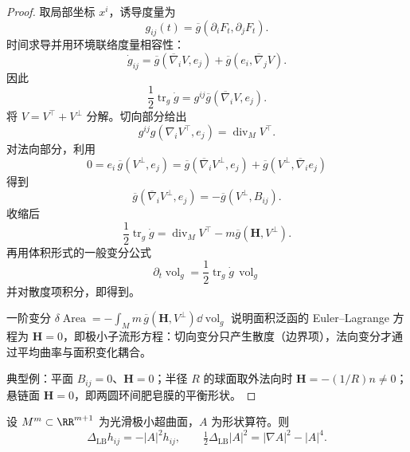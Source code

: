 \begin{proof}
取局部坐标 $x^i$，诱导度量为
\[
g_{ij}(t)
=\overline g(\partial_iF_t,\partial_jF_t).
\]
时间求导并用环境联络度量相容性：
\[
\dot g_{ij}
=\overline g(\overline\nabla_iV,e_j)
+\overline g(e_i,\overline\nabla_jV).
\]
因此
\[
\frac12\operatorname{tr}_g\dot g
=g^{ij}\overline g(\overline\nabla_iV,e_j).
\]
将 $V=V^\top+V^\perp$ 分解。切向部分给出
\[
g^{ij}g(\nabla_iV^\top,e_j)
=\operatorname{div}_M V^\top.
\]
对法向部分，利用
\[
0=e_i\,\overline g(V^\perp,e_j)
=\overline g(\overline\nabla_iV^\perp,e_j)
+\overline g(V^\perp,\overline\nabla_ie_j)
\]
得到
\[
\overline g(\overline\nabla_iV^\perp,e_j)
=-\overline g(V^\perp,B_{ij}).
\]
收缩后
\[
\frac12\operatorname{tr}_g\dot g
=\operatorname{div}_M V^\top
-m\overline g(\mathbf H,V^\perp).
\]
再用体积形式的一般变分公式
\[
\partial_t\operatorname{vol}_g
=\frac12\operatorname{tr}_g\dot g\,\operatorname{vol}_g
\]
并对散度项积分，即得到。

一阶变分 $\delta\operatorname{Area}=-\int_M m\,\overline g(\mathbf H,V^\perp)\dd\operatorname{vol}_g$ 说明面积泛函的 Euler--Lagrange 方程为 $\mathbf H=0$，即极小子流形方程：切向变分只产生散度（边界项），法向变分才通过平均曲率与面积变化耦合。

典型例：平面 $B_{ij}=0$、$\mathbf H=0$；半径 $R$ 的球面取外法向时 $\mathbf H=-(1/R)n\neq0$；悬链面 $\mathbf H=0$，即两圆环间肥皂膜的平衡形状。
\end{proof}

\begin{theorem}
设 $M^m\subset\RR^{m+1}$ 为光滑极小超曲面，$A$ 为形状算符。则\[\Delta_{\mathrm{LB}}h_{ij}=-|A|^2h_{ij},\qquad\tfrac12\Delta_{\mathrm{LB}}|A|^2=|\nabla A|^2-|A|^4.\]
\end{theorem}

